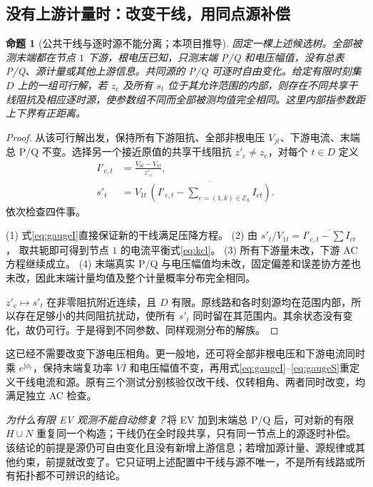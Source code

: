 \documentclass[UTF8,fontset=fandol,11pt,a4paper]{ctexart}
\newtheorem{proposition}{命题}
\begin{document}
\subsection{没有上游计量时：改变干线，用同点源补偿}
\begin{proposition}[公共干线与逐时源不能分离；本项目推导]
固定一棵上述候选树。全部被测末端都在节点 $1$ 下游，根电压已知，只测末端 P/Q 和电压幅值，没有总表 P/Q、源计量或其他上游信息。共同源的 P/Q 可逐时自由变化。给定有限时刻集 $D$ 上的一组可行解，若 $z_{\mathrm c}$ 及所有 $s_t$ 位于其允许范围的内部，则存在不同共享干线阻抗及相应逐时源，使参数组不同而全部被测均值完全相同。这里内部指参数距上下界有正距离。
\end{proposition}
\begin{proof}
从该可行解出发，保持所有下游阻抗、全部非根电压 $V_{jt}$、下游电流、末端总 P/Q 不变。选择另一个接近原值的共享干线阻抗 $z'_{\mathrm c}\ne z_{\mathrm c}$，对每个 $t\in D$ 定义
\begin{align}
 I'_{\mathrm c,t}&=\frac{V_{0t}-V_{1t}}{z'_{\mathrm c}},\label{eq:gaugeI}\\
 s'_t&=V_{1t}\,
 \overline{\left(I'_{\mathrm c,t}
       -\sum_{e=(1,k)\in\mathcal E_h}I_{et}\right)}.\label{eq:gaugeS}
\end{align}
依次检查四件事。

(1) 式\eqref{eq:gaugeI}直接保证新的干线满足压降方程。
(2) 由 $s'_t/V_{1t}=\overline{I'_{\mathrm c,t}-\sum I_{et}}$，
取共轭即可得到节点 $1$ 的电流平衡式\eqref{eq:kcl}。
(3) 所有下游量未改，下游 AC 方程继续成立。
(4) 末端真实 P/Q 与电压幅值均未改，固定偏差和误差协方差也未改，因此末端计量均值及整个计量概率分布完全相同。

$z'_{\mathrm c}\mapsto s'_t$ 在非零阻抗附近连续，且 $D$ 有限。原线路和各时刻源均在范围内部，所以存在足够小的共同阻抗扰动，使所有 $s'_t$ 同时留在其范围内。其余状态没有变化，故仍可行。于是得到不同参数、同样观测分布的解族。
\end{proof}
这已经不需要改变下游电压相角。更一般地，还可将全部非根电压和下游电流同时乘 $e^{\mathrm j\phi_t}$，保持末端复功率 $V\overline I$ 和电压幅值不变，再用式\eqref{eq:gaugeI}--\eqref{eq:gaugeS}重定义干线电流和源。原有三个测试分别核验仅改干线、仅转相角、两者同时改变，均满足独立 AC 检查。

\emph{为什么有限 EV 观测不能自动修复？}将 EV 加到末端总 P/Q 后，可对新的有限 $H\cup N$ 重复同一个构造；干线仍在全时段共享，只有同一节点上的源逐时补偿。该结论的前提是源仍可自由变化且没有新增上游信息；若增加源计量、源规律或其他约束，前提就改变了。它只证明上述配置中干线与源不唯一，不是所有线路或所有拓扑都不可辨识的结论。
\end{document}
